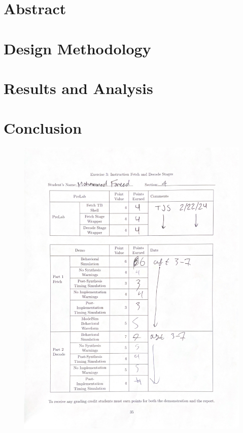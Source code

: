 \documentclass[CMPE]{../KGCOEReport}
\begin{document}
\maketitle

\section*{Abstract}

\section*{Design Methodology}

\section*{Results and Analysis}

\section*{Conclusion}

\newpage
\begin{figure}[H]
    \centering
    \begin{adjustbox}{center}
        \includegraphics[width=1.35\textwidth]{signoff.pdf}
    \end{adjustbox}
\end{figure}
\end{document}
